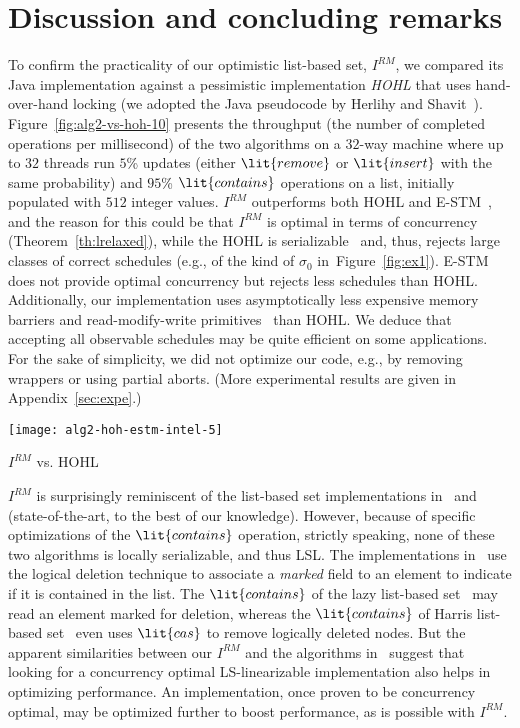 \documentclass[11pt,pdftex,letterpaper]{article}
\begin{document}
 \section{Discussion and concluding remarks}
\label{sec:conc}
To confirm the practicality of our optimistic list-based set, $I^{RM}$,
we compared its Java implementation against a pessimistic
implementation \emph{HOHL}
that uses hand-over-hand locking (we adopted the Java pseudocode by Herlihy and 
Shavit~\cite[Chapter 9]{HS08-book}). 
Figure~\ref{fig:alg2-vs-hoh-10} presents the throughput 
(the number of completed operations per millisecond) 
of the two algorithms on a $32$-way machine 
where up to $32$ threads run $5$\% updates 
(either $\lit{remove}$ or $\lit{insert}$ with the same probability) 
and $95$\% $\lit{contains}$ operations on a list, initially populated
with $512$ integer values. 
$I^{RM}$ outperforms both HOHL and E-STM~\cite{FGG09}, and 
the reason for this could be 
that $I^{RM}$ is optimal in terms of concurrency (Theorem~\ref{th:lrelaxed}), 
while the HOHL is serializable~\cite{ARR10} and, thus, rejects
large classes of correct schedules (e.g., of the kind of $\sigma_0$ in~Figure~\ref{fig:ex1}). 
E-STM does not provide optimal concurrency but rejects less schedules than HOHL.
Additionally, our implementation uses asymptotically less expensive
memory barriers and read-modify-write primitives~\cite{AGK11-popl}
than HOHL.
We deduce that accepting all observable schedules may be 
quite efficient on some applications.
For the sake of simplicity, we did not optimize our code, e.g., 
by removing wrappers or using partial aborts.
(More experimental results are given in Appendix~\ref{sec:expe}.)


\begin{floatingfigure}[right]{0.27\paperwidth}
{\small
\hspace{-2em}\texttt{[image: alg2-hoh-estm-intel-5]}
   \caption{$I^{RM}$ vs. HOHL\label{fig:alg2-vs-hoh-10}}
}\end{floatingfigure}


$I^{RM}$ is surprisingly reminiscent of the
list-based set implementations in~\cite{HHL+05} and \cite{harris-set}
(state-of-the-art, to the best of our knowledge).
However, because of specific optimizations of the $\lit{contains}$
operation, strictly speaking, none of these two algorithms is locally
serializable, and thus LSL.
The implementations in~\cite{HHL+05,harris-set}
use the logical deletion technique to associate a \emph{marked} field to an element to indicate if it
is contained in the list.
The $\lit{contains}$ of the lazy list-based set~\cite{HHL+05} may read an element marked for deletion, whereas
the $\lit{contains}$ of Harris list-based set~\cite{harris-set} even uses $\lit{cas}$ to remove logically deleted nodes.
But the apparent similarities between our $I^{RM}$ and the algorithms
in~\cite{HHL+05,harris-set} suggest
that looking for a concurrency optimal LS-linearizable
implementation also helps in optimizing performance.  
An implementation, once proven to be concurrency optimal, may
be optimized further to boost performance, as is possible with $I^{RM}$.
\end{document}
